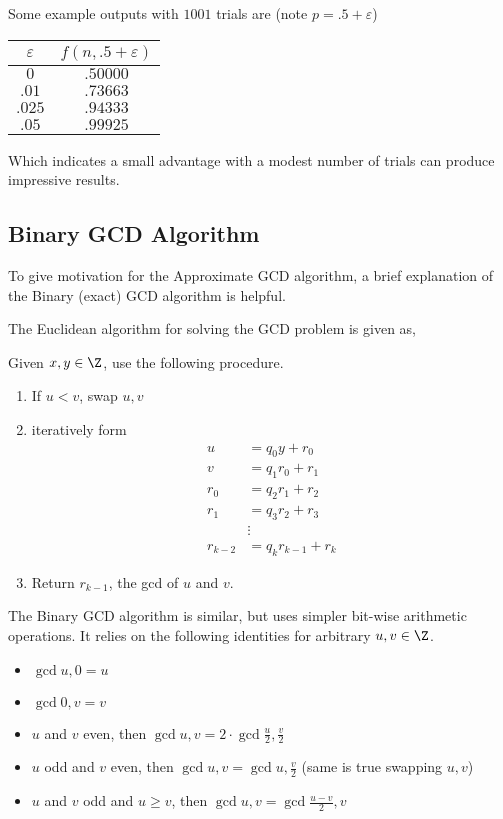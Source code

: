 \documentclass[a4paper,11pt, oneside]{article}
\begin{document}
Some example outputs with $1001$ trials are (note $p = .5 + \varepsilon$) 

\begin{tabular}{|c|c|}\hline
    $\varepsilon$ & $f(n,.5 + \varepsilon)$\\\hline
    $0$ & $.50000$\\\hline
    $.01$ & $.73663$\\\hline
    $.025$ & $.94333$\\\hline
    $.05$ & $.99925$ \\\hline
\end{tabular}

Which indicates a small advantage with a modest number of trials can produce impressive results.


\subsection{Binary GCD Algorithm}
To give motivation for the Approximate GCD algorithm, a brief explanation of the Binary (exact) GCD algorithm is helpful.

The Euclidean algorithm for solving the GCD problem is given as,

    Given $x,y\in\Z$, use the following procedure.
    \begin{enumerate}
        \item If $u < v$, swap $u,v$
        \item iteratively form
            \begin{align*}
                u &= q_0y+r_0\\
                v &= q_1r_0 + r_1\\
                r_0 &= q_2r_1 + r_2\\
                r_1 &= q_3r_2 + r_3\\
                &\vdots\\
                r_{k-2} &= q_kr_{k-1} + r_k
            \end{align*}
        \item Return $r_{k-1}$, the gcd of $u$ and $v$.
    \end{enumerate}

The Binary GCD algorithm is similar, but uses simpler bit-wise arithmetic operations.  It relies on the following identities for arbitrary $u,v\in\Z$.
\begin{itemize}
    \item $\gcd{u,0} = u$
    \item $\gcd{0,v} = v$
    \item $u$ and $v$ even, then $\gcd{u,v} = 2\cdot \gcd{\frac{u}{2},\frac{v}{2}}$
    \item $u$ odd and $v$ even, then $\gcd{u,v} = \gcd{u,\frac{v}{2}}$ (same is true swapping $u,v$)
    \item $u$ and $v$ odd and $u\geq v$, then $\gcd{u,v} = \gcd{ \frac{u-v}{2},v}$
\end{itemize}
\end{document}
